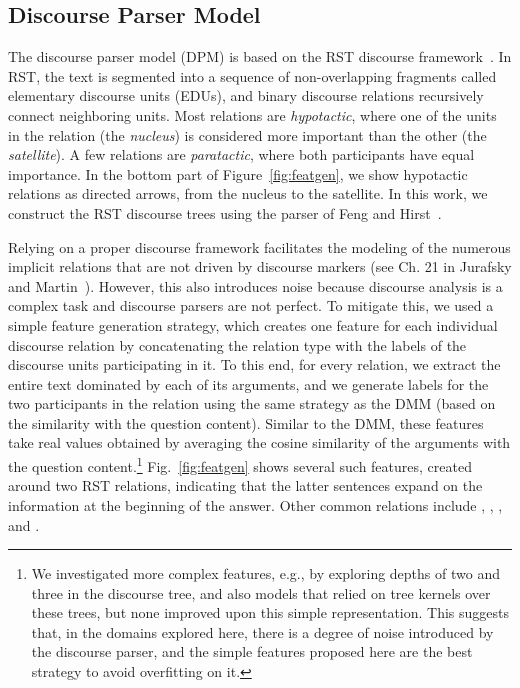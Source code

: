 \subsection{Discourse Parser Model}
\label{sec:features_parser}

The discourse parser model (DPM) is based on the RST discourse framework~\cite{mann88}. 
In RST, the text is segmented into a sequence of non-overlapping fragments called elementary discourse units (EDUs), and binary discourse relations recursively connect neighboring units. Most relations are {\em hypotactic}, where one of the units in the relation (the {\em nucleus}) is considered more important than the other (the {\em satellite}). A few relations are {\em paratactic}, where both participants have equal importance. In the bottom part of Figure~\ref{fig:featgen}, we show hypotactic relations as directed arrows, from the nucleus to the satellite. 
In this work, we construct the RST discourse trees using the parser of Feng and Hirst~\citeyear{feng12}. 

Relying on a proper discourse framework facilitates the modeling of the numerous implicit relations that are not driven by discourse markers (see Ch. 21 in Jurafsky and Martin~\citeyear{jurafsky09}). However, this also introduces noise because discourse analysis is a complex task and discourse parsers are not perfect. 
To mitigate this, we used a simple feature generation strategy, which creates one feature for each individual discourse relation by concatenating the relation type with the labels of the discourse units participating in it. 
To this end, for every relation, we extract the entire text dominated by each of its arguments, and we generate labels for the two participants in the relation using the same strategy as the DMM (based on the similarity with the question content). 
Similar to the DMM, these features take real values obtained by averaging the cosine similarity of the arguments with the question content.\footnote{We investigated more complex features, e.g., by exploring depths of two and three in the discourse tree, and also models that relied on tree kernels over these trees, but none improved upon this simple representation. This suggests that, in the domains explored here, there is a degree of noise introduced by the discourse parser, and the simple features proposed here are the best strategy to avoid overfitting on it.} Fig.~\ref{fig:featgen} shows several such features, created around two RST  relations,  indicating that the latter sentences expand on the information at the beginning of the answer.  
Other common relations include , , , and .

